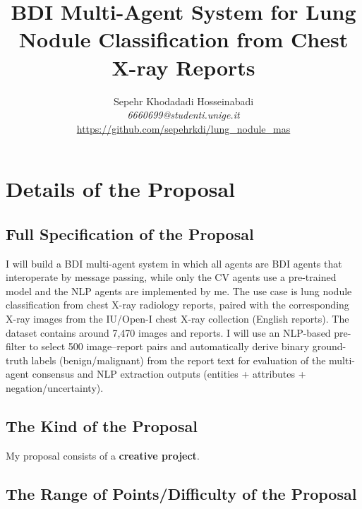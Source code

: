 \documentclass[12pt]{article}
\begin{document}
\title{BDI Multi-Agent System for Lung Nodule Classification from Chest X-ray Reports}
\author{Sepehr Khodadadi Hosseinabadi\\
{\em 6660699@studenti.unige.it}\\
\url{https://github.com/sepehrkdi/lung_nodule_mas}}
\maketitle

\section{Details of the Proposal}
\label{sec:yourProposal}

\subsection{Full Specification of the Proposal}
\label{subsec:specification}

I will build a BDI multi-agent system in which all agents are BDI agents that interoperate by message passing, while only the CV agents use a pre-trained model and the NLP agents are implemented by me. The use case is lung nodule classification from chest X-ray radiology reports, paired with the corresponding X-ray images from the IU/Open-I chest X-ray collection (English reports). The dataset contains around 7,470 images and reports. I will use an NLP-based pre-filter to select 500 image--report pairs and automatically derive binary ground-truth labels (benign/malignant) from the report text for evaluation of the multi-agent consensus and NLP extraction outputs (entities + attributes + negation/uncertainty).



\subsection{The Kind of the Proposal}
\label{subsec:kind}

My proposal consists of a \textbf{creative project}.

\subsection{The Range of Points/Difficulty of the Proposal}
\label{subsec:points}
\end{document}
